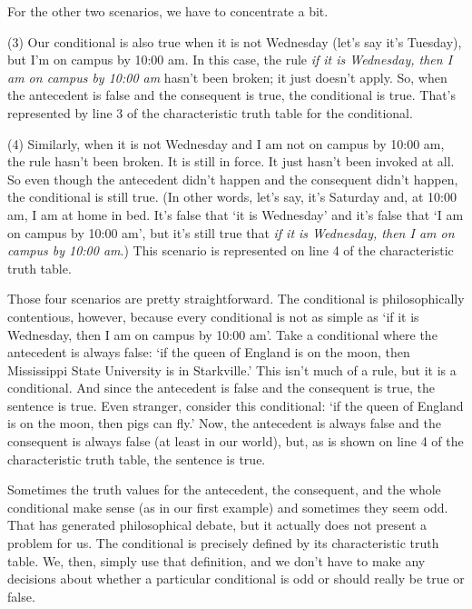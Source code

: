 For the other two scenarios, we have to concentrate a bit. 

\begin{ebullet}	
\item[(3)] Our conditional is also true when it is not Wednesday (let's say it's Tuesday), but I'm on campus by 10:00 am. In this case, the rule \textit{if it is Wednesday, then I am on campus by 10:00 am} hasn't been broken; it just doesn't apply. So, when the antecedent is false and the consequent is true, the conditional is true. That's represented by line 3 of the characteristic truth table for the conditional. 
\item[(4)] Similarly, when it is not Wednesday and I am not on campus by 10:00 am, the rule hasn't been broken. It is still in force. It just hasn't been invoked at all. So even though the antecedent didn't happen and the consequent didn't happen, the conditional is still true. (In other words, let's say, it's Saturday and, at 10:00 am, I am at home in bed. It's false that `it is Wednesday' and it's false that `I am on campus by 10:00 am', but it's still true that \textit{if it is Wednesday, then I am on campus by 10:00 am}.) This scenario is represented on line 4 of the characteristic truth table.
\end{ebullet}

Those four scenarios are pretty straightforward. The conditional is philosophically contentious, however, because every conditional is not as simple as `if it is Wednesday, then I am on campus by 10:00 am'. Take a conditional where the antecedent is always false: `if the queen of England is on the moon, then Mississippi State University is in Starkville.' This isn't much of a rule, but it is a conditional. And since the antecedent is false and the consequent is true, the sentence is true. Even stranger, consider this conditional: `if the queen of England is on the moon, then pigs can fly.' Now, the antecedent is always false and the consequent is always false (at least in our world), but, as is shown on line 4 of the characteristic truth table, the sentence is true. 

Sometimes the truth values for the antecedent, the consequent, and the whole conditional make sense (as in our first example) and sometimes they seem odd. That has generated philosophical debate, but it actually does not present a problem for us. The conditional is precisely defined by its characteristic truth table. We, then, simply use that definition, and we don't have to make any decisions about whether a particular conditional is odd or should really be true or false. 

